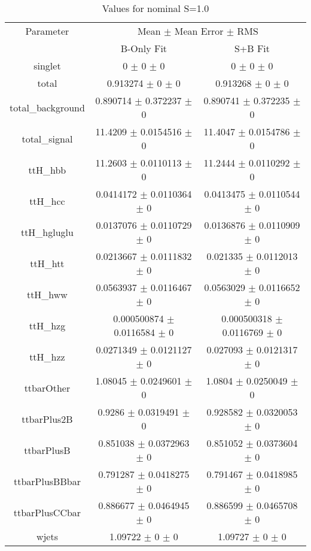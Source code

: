 \begin{table}
\centering
\caption{Values for nominal S=1.0}
\begin{tabular}{ccc}
\toprule
Parameter & \multicolumn{2}{c}{Mean $\pm$ Mean Error $\pm$ RMS}\\
 & B-Only Fit & S+B Fit\\
\midrule
singlet & \num{0} $\pm$ \num{0} $\pm$ \num{0} & \num{0} $\pm$ \num{0} $\pm$ \num{0}\\
total & \num{0.913274} $\pm$ \num{0} $\pm$ \num{0} & \num{0.913268} $\pm$ \num{0} $\pm$ \num{0}\\
total\_background & \num{0.890714} $\pm$ \num{0.372237} $\pm$ \num{0} & \num{0.890741} $\pm$ \num{0.372235} $\pm$ \num{0}\\
total\_signal & \num{11.4209} $\pm$ \num{0.0154516} $\pm$ \num{0} & \num{11.4047} $\pm$ \num{0.0154786} $\pm$ \num{0}\\
ttH\_hbb & \num{11.2603} $\pm$ \num{0.0110113} $\pm$ \num{0} & \num{11.2444} $\pm$ \num{0.0110292} $\pm$ \num{0}\\
ttH\_hcc & \num{0.0414172} $\pm$ \num{0.0110364} $\pm$ \num{0} & \num{0.0413475} $\pm$ \num{0.0110544} $\pm$ \num{0}\\
ttH\_hgluglu & \num{0.0137076} $\pm$ \num{0.0110729} $\pm$ \num{0} & \num{0.0136876} $\pm$ \num{0.0110909} $\pm$ \num{0}\\
ttH\_htt & \num{0.0213667} $\pm$ \num{0.0111832} $\pm$ \num{0} & \num{0.021335} $\pm$ \num{0.0112013} $\pm$ \num{0}\\
ttH\_hww & \num{0.0563937} $\pm$ \num{0.0116467} $\pm$ \num{0} & \num{0.0563029} $\pm$ \num{0.0116652} $\pm$ \num{0}\\
ttH\_hzg & \num{0.000500874} $\pm$ \num{0.0116584} $\pm$ \num{0} & \num{0.000500318} $\pm$ \num{0.0116769} $\pm$ \num{0}\\
ttH\_hzz & \num{0.0271349} $\pm$ \num{0.0121127} $\pm$ \num{0} & \num{0.027093} $\pm$ \num{0.0121317} $\pm$ \num{0}\\
ttbarOther & \num{1.08045} $\pm$ \num{0.0249601} $\pm$ \num{0} & \num{1.0804} $\pm$ \num{0.0250049} $\pm$ \num{0}\\
ttbarPlus2B & \num{0.9286} $\pm$ \num{0.0319491} $\pm$ \num{0} & \num{0.928582} $\pm$ \num{0.0320053} $\pm$ \num{0}\\
ttbarPlusB & \num{0.851038} $\pm$ \num{0.0372963} $\pm$ \num{0} & \num{0.851052} $\pm$ \num{0.0373604} $\pm$ \num{0}\\
ttbarPlusBBbar & \num{0.791287} $\pm$ \num{0.0418275} $\pm$ \num{0} & \num{0.791467} $\pm$ \num{0.0418985} $\pm$ \num{0}\\
ttbarPlusCCbar & \num{0.886677} $\pm$ \num{0.0464945} $\pm$ \num{0} & \num{0.886599} $\pm$ \num{0.0465708} $\pm$ \num{0}\\
wjets & \num{1.09722} $\pm$ \num{0} $\pm$ \num{0} & \num{1.09727} $\pm$ \num{0} $\pm$ \num{0}\\
\bottomrule
\end{tabular}
\end{table}